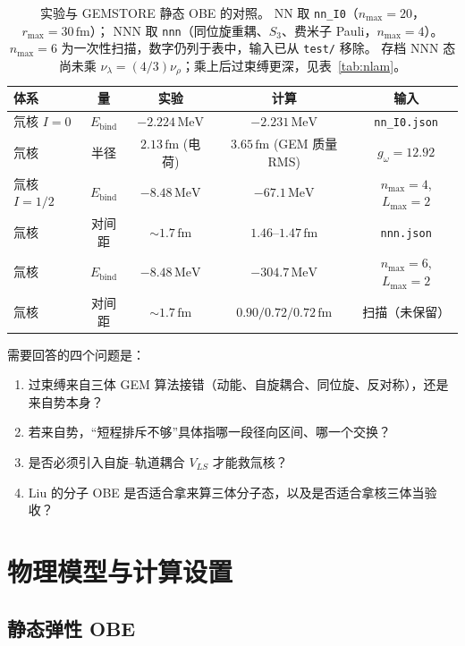 \documentclass[12pt,a4paper]{article}
\newcommand{\MeV}{\,\mathrm{MeV}}
\newcommand{\fm}{\,\mathrm{fm}}
\begin{document}
\begin{table}[htbp]
\centering
\caption{实验与 GEMSTORE 静态 OBE 的对照。
NN 取 \texttt{nn\_I0}（$n_{\max}=20$，$r_{\max}=30\fm$）；
NNN 取 \texttt{nnn}（同位旋重耦、$S_3$、费米子 Pauli，$n_{\max}=4$）。
$n_{\max}=6$ 为一次性扫描，数字仍列于表中，输入已从 \texttt{test/} 移除。
存档 NNN 态尚未乘 $\nu_\lambda=(4/3)\nu_\rho$；乘上后过束缚更深，见表~\ref{tab:nlam}。}
\label{tab:exp-vs-calc}
\begin{tabular}{@{}lcccc@{}}
\toprule
体系 & 量 & 实验 & 计算 & 输入 \\
\midrule
氘核 $I=0$ & $E_{\mathrm{bind}}$ & $-2.224\MeV$ & $-2.231\MeV$
  & \texttt{nn\_I0.json} \\
氘核 & 半径 & $2.13\fm$ (电荷) & $3.65\fm$ (GEM 质量 RMS)
  & $g_\omega=12.92$ \\
氚核 $I=1/2$ & $E_{\mathrm{bind}}$ & $-8.48\MeV$ & $-67.1\MeV$
  & $n_{\max}=4$, $L_{\max}=2$ \\
氚核 & 对间距 & $\sim 1.7\fm$ & $1.46$--$1.47\fm$
  & \texttt{nnn.json} \\
氚核 & $E_{\mathrm{bind}}$ & $-8.48\MeV$ & $-304.7\MeV$
  & $n_{\max}=6$, $L_{\max}=2$ \\
氚核 & 对间距 & $\sim 1.7\fm$ & $0.90/0.72/0.72\fm$
  & 扫描（未保留） \\
\bottomrule
\end{tabular}
\end{table}

需要回答的四个问题是：

\begin{enumerate}
  \item 过束缚来自三体 GEM 算法接错（动能、自旋耦合、同位旋、反对称），还是来自势本身？
  \item 若来自势，``短程排斥不够''具体指哪一段径向区间、哪一个交换？
  \item 是否必须引入自旋--轨道耦合 $V_{LS}$ 才能救氚核？
  \item Liu 的分子 OBE 是否适合拿来算三体分子态，以及是否适合拿核三体当验收？
\end{enumerate}

\section{物理模型与计算设置}

\subsection{静态弹性 OBE}
\end{document}
